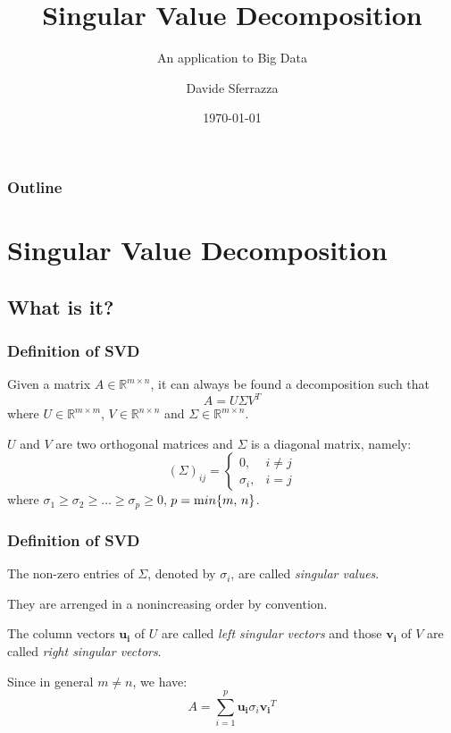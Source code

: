 \documentclass{beamer}
\title{Singular Value Decomposition}
\subtitle{An application to Big Data}
\author{Davide Sferrazza}
\institute{Università degli Studi di Palermo}
\date{\today}
\begin{document}
\begin{frame}
    \titlepage
\end{frame}

\begin{frame}
    \frametitle{Outline}
    \tableofcontents
\end{frame}

\section{Singular Value Decomposition}
\subsection{What is it?}

\begin{frame}
    \frametitle{Definition of SVD}
    \begin{theorem}
        Given a matrix $A \in \mathbb{R}^{m \times n}$, it can always be found a decomposition such that
        $$A = U \Sigma V^T$$
        where $U \in \mathbb{R}^{m \times m}$, $V \in \mathbb{R}^{n \times n}$ and $\Sigma \in \mathbb{R}^{m \times n}$.

        $U$ and $V$ are two orthogonal matrices and $\Sigma$ is a diagonal matrix, namely:
        $$ ( \Sigma )_{ij} = 
            \begin{cases}
                0, & i \ne j \\
                \sigma_i, & i = j
            \end{cases} 
        $$
        where $\sigma_1 \ge \sigma_2 \ge \ldots  \ge \sigma_p \ge 0$, $p = \textrm min\{m, \, n\}$.
    \end{theorem}
\end{frame}

\begin{frame}
    \frametitle{Definition of SVD}
    The non-zero entries of $\Sigma$, denoted by $\sigma_i$, are called \textit{singular values}.

    They are arrenged in a nonincreasing order by convention.

    The column vectors $\bm{u_i}$ of $U$ are called \textit{left singular vectors} and those $\bm{v_i}$ of $V$ are called \textit{right singular vectors}. \bigskip
    
    Since in general $m \ne n$, we have: 
    $$ A = \sum_{i = 1}^{p} \bm{u_i} \sigma_i \bm{v_i}^T $$

\end{frame}
\end{document}
